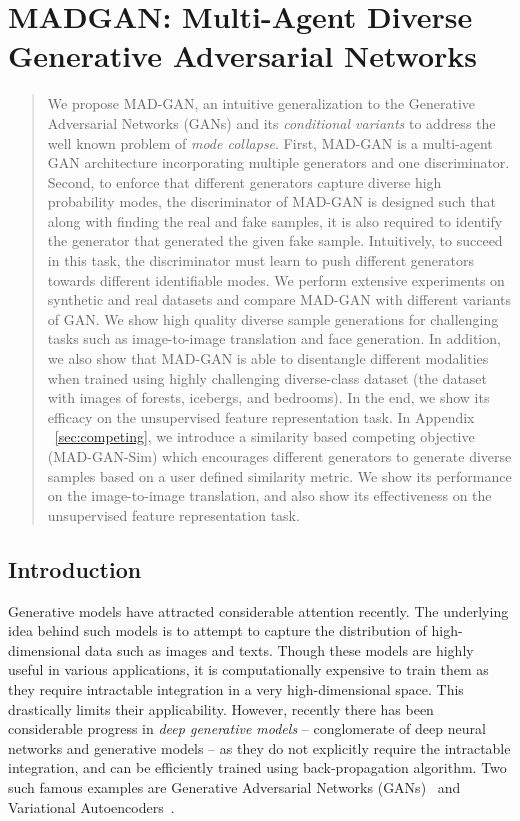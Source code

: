 
\chapter{MADGAN: Multi-Agent Diverse Generative Adversarial Networks
}

\begin{abstract}
	We propose MAD-GAN, an intuitive generalization to the Generative Adversarial Networks (GANs) and its {\em conditional variants} to address the well known problem of {\em mode collapse}. First, MAD-GAN is a multi-agent GAN architecture incorporating multiple generators and one discriminator. Second, to enforce that different generators capture diverse high probability modes, the discriminator of MAD-GAN is designed such that along with finding the real and fake samples, it is also required to identify the generator that generated the given fake sample. Intuitively, to succeed in this task, the discriminator must learn to push different generators towards different identifiable modes. 
	We perform extensive experiments on synthetic and real datasets and compare MAD-GAN with different variants of GAN. 
	We show high quality diverse sample generations for challenging tasks such as image-to-image translation and face generation. In addition, we also show that MAD-GAN is able to disentangle different modalities when trained using highly challenging diverse-class dataset (\eg the dataset with images of forests, icebergs, and bedrooms). In the end, we show its efficacy on the unsupervised feature representation task. In Appendix ~\ref{sec:competing}, we introduce a similarity based competing objective (MAD-GAN-Sim) which encourages different generators to generate diverse samples based on a user defined similarity metric. We show its performance on the image-to-image translation, and also show its effectiveness on the unsupervised feature representation task.
\end{abstract}


\section{Introduction}

Generative models have attracted considerable attention recently. The underlying idea behind such models is to attempt to capture the distribution of high-dimensional data such as images and texts. Though these models are highly useful in various applications, it is computationally expensive to train them as they require intractable integration in a very high-dimensional space. This drastically limits their applicability. However, recently there has been considerable progress in {\em deep generative models} -- conglomerate of deep neural networks and generative models -- as they do not explicitly require the intractable integration, and can be efficiently trained using back-propagation algorithm. Two such famous examples are Generative Adversarial Networks (GANs)~\cite{goodfellow2014generative} and Variational Autoencoders~\cite{kingma2013auto}.



